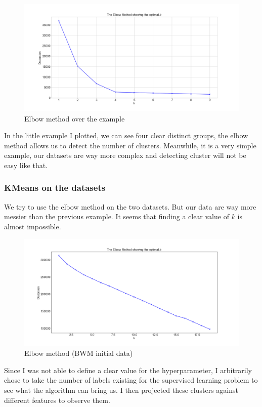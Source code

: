 \documentclass[15pt]{article}
\begin{document}
\begin{multicols}{2}
\begin{figure}[H]
\centering
\includegraphics[width = \columnwidth]{elbowblob.png}
\caption{Elbow method over the example}
\end{figure}

In the little example I plotted, we can see four clear distinct groups, the elbow method allows us to detect the number of clusters. Meanwhile, it is a very simple example, our datasets are way more complex and detecting cluster will not be easy like that.

\subsubsection{KMeans on the datasets}

We try to use the elbow method on the two datasets. But our data are way more messier than the previous example. It seems that finding a clear value of $k$ is almost impossible.

\begin{figure}[H]
\centering
\includegraphics[width = \columnwidth]{elbowkm.png}
\caption{Elbow method (BWM initial data)}
\end{figure}

Since I was not able to define a clear value for the hyperparameter, I arbitrarily chose to take the number of labels existing for the supervised learning problem to see what the algorithm can bring us. I then projected these clusters against different features to observe them.


\end{multicols}
\end{document}
